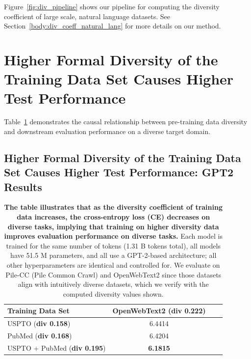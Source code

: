 Figure~\ref{fig:div_pipeline} shows our pipeline for computing the diversity coefficient of large scale, natural language datasets. See Section~\ref{body:div_coeff_natural_lang} for more details on our method.

\section{Higher Formal Diversity of the Training Data Set Causes Higher Test Performance}
Table~\ref{tab:div_vs_ppl} demonstrates the causal relationship between pre-training data diversity and downstream evaluation performance on a diverse target domain. 

\subsection{Higher Formal Diversity of the Training Data Set Causes Higher Test Performance: GPT2 Results}

\begin{table}[h!]
    \centering
    \caption{\textbf{The table illustrates that as the diversity coefficient of training data increases, the cross-entropy loss (CE) decreases on diverse tasks, implying that training on higher diversity data improves evaluation performance on diverse tasks.} 
    Each model is trained for the same number of tokens (1.31 B tokens total), 
    all models have 51.5 M parameters, and all use a GPT-2-based architecture; all other hyperparameters are identical and controlled for.
    We evaluate on Pile-CC (Pile Common Crawl) and OpenWebText2 since those datasets align with intuitively diverse datasets, which we verify with the computed diversity values shown.
    }
    \vspace{10pt}
    \begin{tabular}{lccc}
        \toprule
        Training Data Set & OpenWebText2 (\textbf{div 0.222}) \\
        \midrule
        USPTO (\textbf{div 0.158}) & 6.4414 \\
        PubMed (\textbf{div 0.168})  & 6.4204 \\
        USPTO + PubMed (\textbf{div 0.195}) & \textbf{6.1815} \\
        \bottomrule
    \end{tabular}
    \label{tab:div_vs_ppl}
\end{table}

